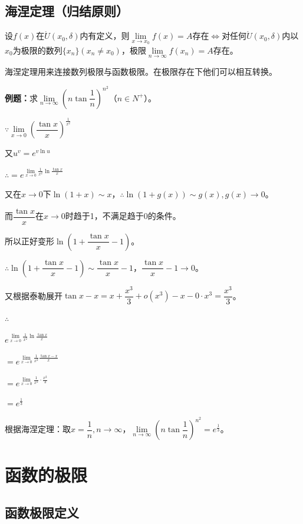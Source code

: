 \documentclass[UTF8, 12pt]{ctexart}
\begin{document}
    \subsection{海涅定理（归结原则）}

    设$f(x)$在$\mathring{U}(x_0,\delta)$内有定义，则$\lim\limits_{x\to x_0}f(x)=A$存在$\Leftrightarrow$对任何$\mathring{U}(x_0,\delta)$内以$x_0$为极限的数列$\{x_n\}(x_n\neq x_0)$，极限$\lim\limits_{n\to\infty}f(x_n)=A$存在。

    海涅定理用来连接数列极限与函数极限。在极限存在下他们可以相互转换。

    \textbf{例题：}求$\lim\limits_{n\to\infty}\left(n\tan\dfrac{1}{n}\right)^{n^2}$（$n\in N^+$）。

    $\because \lim\limits_{x\to 0}\left(\dfrac{\tan x}{x}\right)^{\frac{1}{x^2}}$

    又$u^v=e^{v\ln u}$

    $\therefore =e^{\lim\limits_{x\to 0}\frac{1}{x^2}\ln\frac{\tan x}{x}}$

    又在$x\to 0$下$\ln (1+x)\sim x$，$\therefore \ln(1+g(x))\sim g(x),g(x)\to 0$。

    而$\dfrac{\tan x}{x}$在$x\to 0$时趋于1，不满足趋于0的条件。

    所以正好变形$\ln\left(1+\dfrac{\tan x}{x}-1\right)$。

    $\therefore \ln\left(1+\dfrac{\tan x}{x}-1\right)\sim\dfrac{\tan x}{x}-1$，$\dfrac{\tan x}{x}-1\to 0$。

    又根据泰勒展开$\tan x-x=x+\dfrac{x^3}{3}+o(x^3)-x-0\cdot x^3=\dfrac{x^3}{3}$。

    $\therefore$ \medskip

    $e^{\lim\limits_{x\to 0}\frac{1}{x^2}\ln\frac{\tan x}{x}}$

    $=e^{\lim\limits_{x\to 0}\frac{1}{x^2}\frac{\tan x-x}{x}}$

    $=e^{\lim\limits_{x\to 0}\frac{1}{x^2}\cdot\frac{x^2}{3}}$

    $= e^{\frac{1}{3}}$

    根据海涅定理：取$x=\dfrac{1}{n},n\to\infty$，$\lim\limits_{n\to\infty}\left(n\tan\dfrac{1}{n}\right)^{n^2}=e^{\frac{1}{3}}$。


    \section{函数的极限}

    \subsection{函数极限定义}
\end{document}
